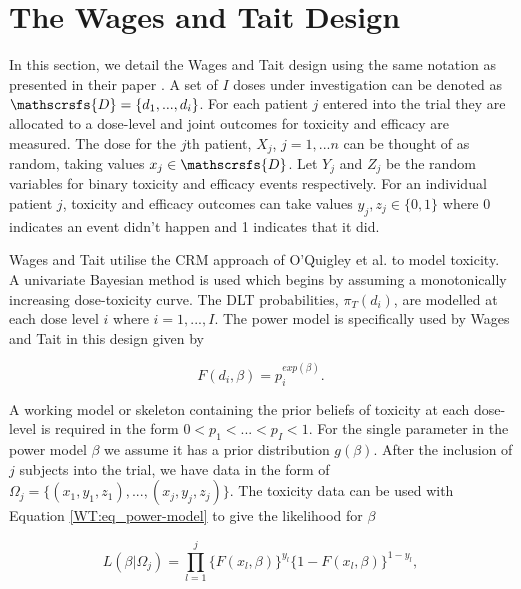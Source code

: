 \section{The Wages and Tait Design}
\label{WT:Wages-and-Tait-Design}

In this section, we detail the Wages and Tait design using the same notation as presented in their paper \cite{wagesSeamlessPhaseII2015}. A set of $I$ doses under investigation can be denoted as $\mathscrsfs{D} = \{d_1, ...,d_i\}$. For each patient $j$ entered into the trial they are allocated to a dose-level and joint outcomes for toxicity and efficacy are measured. The dose for the $j$th patient, $X_j$, $j = 1,...n$ can be thought of as random, taking values $x_j \in  \mathscrsfs{D}$. Let $Y_j$ and $Z_j$ be the random variables for binary toxicity and efficacy events respectively. For an individual patient $j$, toxicity and efficacy outcomes can take values $y_j, z_j \in \{0,1\}$ where 0 indicates an event didn't happen and 1 indicates that it did. 

Wages and Tait \cite{wagesSeamlessPhaseII2015} utilise the CRM approach of O'Quigley et al. \cite{oquigleyContinualReassessmentMethod1990} to model toxicity. A univariate Bayesian method is used which begins by assuming a monotonically increasing dose-toxicity curve. The DLT probabilities, $\pi_T(d_i)$, are modelled at each dose level $i$ where $i= 1, ..., I$. The power model is specifically used by Wages and Tait in this design given by 

\begin{equation}
	\label{WT:eq_power-model}
	F(d_i, \beta) = p_i^{exp(\beta)}.
\end{equation}

A working model or skeleton containing the prior beliefs of toxicity at each dose-level is required in the form $0 < p_1 < ... <p_I <1$. For the single parameter in the power model $\beta$ we assume it has a prior distribution $g(\beta)$. After the inclusion of $j$ subjects into the trial, we have  data in the form of $\Omega_j = \{(x_1,y_1,z_1), ..., (x_j,y_j,z_j)\}$. The toxicity data can be used with Equation \ref{WT:eq_power-model} to give the likelihood for $\beta$

\begin{equation}
	L(\beta|\Omega_j)=\prod_{l=1}^{j}\{F(x_l,\beta)\}^{y_l}\{1-F(x_l,\beta)\}^{1-y_l},  
\end{equation}

